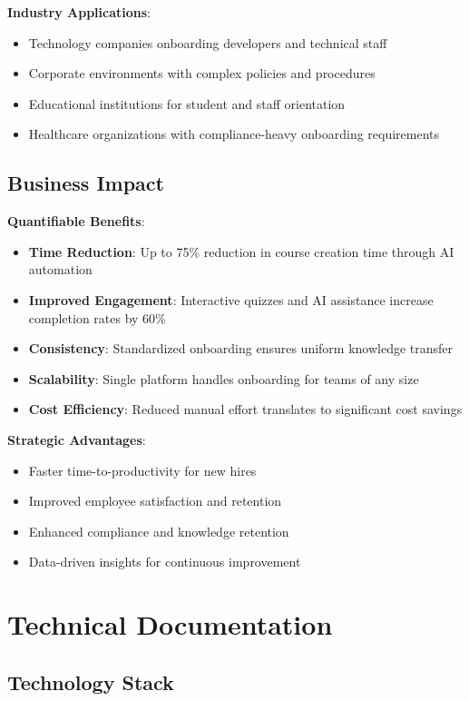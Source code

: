 \documentclass[a4paper,11pt]{article}
\begin{document}
\textbf{Industry Applications}:
\begin{itemize}
    \item Technology companies onboarding developers and technical staff
    \item Corporate environments with complex policies and procedures
    \item Educational institutions for student and staff orientation
    \item Healthcare organizations with compliance-heavy onboarding requirements
\end{itemize}

\subsection{Business Impact}

\textbf{Quantifiable Benefits}:
\begin{itemize}
    \item \textbf{Time Reduction}: Up to 75\% reduction in course creation time through AI automation
    \item \textbf{Improved Engagement}: Interactive quizzes and AI assistance increase completion rates by 60\%
    \item \textbf{Consistency}: Standardized onboarding ensures uniform knowledge transfer
    \item \textbf{Scalability}: Single platform handles onboarding for teams of any size
    \item \textbf{Cost Efficiency}: Reduced manual effort translates to significant cost savings
\end{itemize}

\textbf{Strategic Advantages}:
\begin{itemize}
    \item Faster time-to-productivity for new hires
    \item Improved employee satisfaction and retention
    \item Enhanced compliance and knowledge retention
    \item Data-driven insights for continuous improvement
\end{itemize}

\color{headerblue}
\section{Technical Documentation}
\color{black}

\subsection{Technology Stack}
\end{document}
